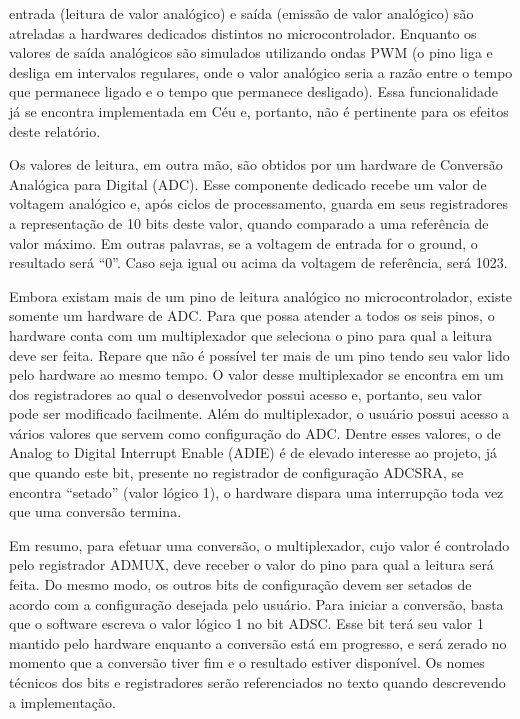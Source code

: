\documentclass{article}
\begin{document}
entrada (leitura de valor analógico) e saída (emissão de valor analógico) são atreladas a hardwares
dedicados distintos no microcontrolador. Enquanto os valores de saída analógicos são simulados
utilizando ondas PWM (o pino liga e desliga em intervalos regulares, onde o valor analógico seria a
razão entre o tempo que permanece ligado e o tempo que permanece desligado). Essa funcionalidade
já se encontra implementada em Céu e, portanto, não é pertinente para os efeitos deste relatório.
\par Os valores de leitura, em outra mão, são obtidos por um hardware de Conversão Analógica para
Digital (ADC). Esse componente dedicado recebe um valor de voltagem analógico e, após ciclos de
processamento, guarda em seus registradores a representação de 10 bits deste valor, quando
comparado a uma referência de valor máximo. Em outras palavras, se a voltagem de entrada for o
ground, o resultado será “0”. Caso seja igual ou acima da voltagem de referência, será 1023.
\par Embora existam mais de um pino de leitura analógico no microcontrolador, existe somente um
hardware de ADC. Para que possa atender a todos os seis pinos, o hardware conta com um
multiplexador que seleciona o pino para qual a leitura deve ser feita. Repare que não é possível ter
mais de um pino tendo seu valor lido pelo hardware ao mesmo tempo. O valor desse multiplexador se
encontra em um dos registradores ao qual o desenvolvedor possui acesso e, portanto, seu valor pode
ser modificado facilmente. Além do multiplexador, o usuário possui acesso a vários valores que
servem como configuração do ADC. Dentre esses valores, o de Analog to Digital Interrupt
Enable (ADIE) é de elevado interesse ao projeto, já que quando este bit, presente no registrador de
configuração ADCSRA, se encontra “setado” (valor lógico 1), o hardware dispara uma interrupção
toda vez que uma conversão termina.
\par Em resumo, para efetuar uma conversão, o multiplexador, cujo valor é controlado pelo registrador
ADMUX, deve receber o valor do pino para qual a leitura será feita. Do mesmo modo, os outros
bits de configuração devem ser setados de acordo com a configuração desejada pelo usuário. Para
iniciar a conversão, basta que o software escreva o valor lógico 1 no bit ADSC. Esse bit terá seu valor
1 mantido pelo hardware enquanto a conversão está em progresso, e será zerado no momento que a
conversão tiver fim e o resultado estiver disponível. Os nomes técnicos dos bits e registradores serão
referenciados no texto quando descrevendo a implementação.
\end{document}
